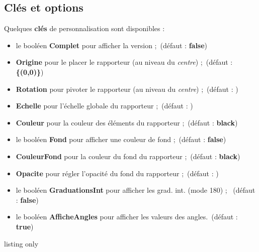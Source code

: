 \documentclass[french,a4paper,11pt]{article}
\newcommand\Cle[1]{{\bfseries\sffamily\textlangle #1\textrangle}}
\begin{document}
\subsection{Clés et options}

\begin{tipblock}
Quelques \Cle{clés} de personnalisation sont disponibles :

\begin{itemize}
	\item le booléen \Cle{Complet} pour afficher la version  \fg{};\hfill~(défaut : \Cle{false})
	\item \Cle{Origine} pour le placer le rapporteur (au niveau du \textit{centre}) ;\hfill~(défaut : \Cle{\{(0,0)\}})
	\item \Cle{Rotation} pour pivoter le rapporteur (au niveau du \textit{centre}) ;\hfill~(défaut : \Cle{0})
	\item \Cle{Echelle} pour l'échelle globale du rapporteur ;\hfill~(défaut : \Cle{1})
	\item \Cle{Couleur} pour la couleur des éléments du rapporteur ;\hfill~(défaut : \Cle{black})
	\item le booléen \Cle{Fond} pour afficher une couleur de fond ;\hfill~(défaut : \Cle{false})
	\item \Cle{CouleurFond} pour la couleur du fond du rapporteur ;\hfill~(défaut : \Cle{black})
	\item \Cle{Opacite} pour régler l'opacité du fond du rapporteur ;\hfill~(défaut : \Cle{0.5})
	\item le booléen \Cle{GraduationsInt} pour afficher les grad. int. (mode 180) ; \hfill~(défaut : \Cle{false})
	\item le booléen \Cle{AfficheAngles} pour afficher les valeurs des angles.\hfill~(défaut : \Cle{true})
\end{itemize}
\vspace*{-\baselineskip}\leavevmode
\end{tipblock}

\begin{PresentationCode}{listing only}
\tkzRapporteur[Fond,CouleurFond=purple,GraduationsInt]
\tkzRapporteur[Origine={(-2,-3)},Rotation=-45,Couleur=ForestGreen,Echelle=0.5]
\tkzRapporteur[Complet,Origine={(8,-3)},Rotation=30,Couleur=DarkBlue, Echelle=0.75]
\tkzRapporteur[Origine={(7,1)},Rotation=15,Couleur=orange, Echelle=0.75,AfficheAngles=false]
\tkzRapporteur[Complet,Origine={(8,-3)},Rotation=30,Couleur=DarkBlue, Echelle=0.75]
\tkzRapporteur[Complet,Origine={(2,-4)},Rotation=-90,Couleur=red, Echelle=0.5,AfficheAngles=false,Fond,CouleurFond=yellow]
\end{PresentationCode}
\end{document}
